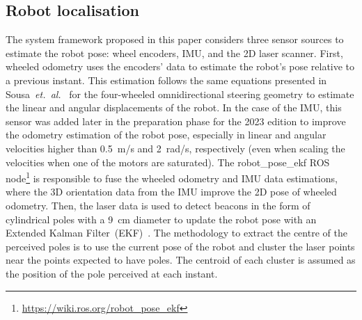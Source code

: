 \documentclass[conference]{IEEEtran}
\newcommand{\etal}{\textit{et.~al.}}
\begin{document}
\subsection{Robot localisation}

The system framework proposed in this paper considers three sensor sources to estimate the robot pose: wheel encoders, IMU, and the 2D laser scanner.
First, wheeled odometry uses the encoders' data to estimate the robot's pose relative to a previous instant.
This estimation follows the same equations presented in Sousa~\etal~\cite{5dpo:sousa-2022} for the four-wheeled omnidirectional steering geometry to estimate the linear and angular displacements of the robot.
In the case of the IMU, this sensor was added later in the preparation phase for the 2023 edition to improve the odometry estimation of the robot pose, especially in linear and angular velocities higher than 0.5~m/s and 2~rad/s, respectively (even when scaling the velocities when one of the motors are saturated).
The robot\_pose\_ekf ROS node\footnote{\url{https://wiki.ros.org/robot_pose_ekf}} is responsible to fuse the wheeled odometry and IMU data estimations, where the 3D orientation data from the IMU improve the 2D pose of wheeled odometry.
Then, the laser data is used to detect beacons in the form of cylindrical poles with a 9~cm diameter to update the robot pose with an Extended Kalman Filter~(EKF)~\cite{book:intro-robotics}.
The methodology to extract the centre of the perceived poles is to use the current pose of the robot and cluster the laser points near the points expected to have poles.
The centroid of each cluster is assumed as the position of the pole perceived at each instant.
\end{document}
